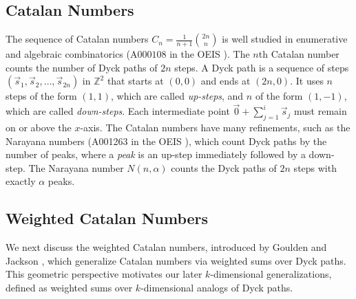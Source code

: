 \documentclass[11pt]{article}
\theoremstyle{remark}
\theoremstyle{definition}
\begin{document}
\subsection{Catalan Numbers}
The sequence of Catalan numbers $\displaystyle C_n = \frac{1}{n+1} \binom{2n}{n}$ is well studied in enumerative and algebraic combinatorics (A$000108$ in the OEIS \cite{oeis}). The $n$th Catalan number counts the number of Dyck paths of $2n$ steps. A Dyck path is a sequence of steps $(\vec{s}_1, \vec{s}_2, \dots, \vec{s}_{2n})$ in $\mathbb{Z}^2$ that starts at $(0,0)$ and ends at $(2n,0)$. It uses $n$ steps of the form $(1,1)$, which are called \textit{up-steps}, and $n$ of the form $(1, -1)$, which are called \textit{down-steps}. Each intermediate point $\vec{0}+\sum_{j=1}^i\vec{s}_j$ must remain on or above the $x$-axis. The Catalan numbers have many refinements, such as the Narayana numbers (A001263 in the OEIS \cite{oeis}), which count Dyck paths by the number of peaks, where a {\em peak} is an up-step immediately followed by a down-step. The Narayana number $N(n, \alpha)$ counts the Dyck paths of $2n$ steps with exactly $\alpha$ peaks.

    



\subsection{Weighted Catalan Numbers}\label{sec:WCN}
We next discuss the weighted Catalan numbers, introduced by Goulden and Jackson \cite{Goulden}, which generalize Catalan numbers via weighted sums over Dyck paths. This geometric perspective motivates our later $k$-dimensional generalizations, defined as weighted sums over $k$-dimensional analogs of Dyck paths.
\end{document}
